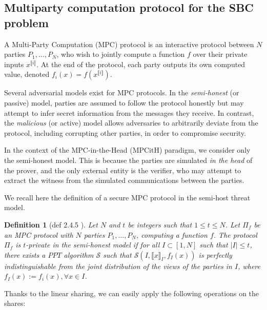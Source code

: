 \documentclass[english]{article}
\newtheorem{definition}{Definition}[section]
\newcommand{\lir}{\llbracket i \rrbracket}
\begin{document}
		\subsection{Multiparty computation protocol for the SBC problem}
		A Multi-Party Computation (MPC) protocol is an interactive protocol between $N$ parties $P_1, \dots, P_N$, who wish to jointly compute a function $f$ over their private inputs $x^{\lir}$. At the end of the protocol, each party outputs its own computed value, denoted $f_i(x) = f(x^{\lir})$.
		
		Several adversarial models exist for MPC protocols. In the \emph{semi-honest} (or passive) model, parties are assumed to follow the protocol honestly but may attempt to infer secret information from the messages they receive. In contrast, the \emph{malicious} (or active) model allows adversaries to arbitrarily deviate from the protocol, including corrupting other parties, in order to compromise security.
		
		In the context of the MPC-in-the-Head (MPCitH) paradigm, we consider only the semi-honest model. This is because the parties are simulated \emph{in the head} of the prover, and the only external entity is the verifier, who may attempt to extract the witness from the simulated communications between the parties.
		
		We recall here the definition of a secure MPC protocol in the semi-host threat model.
		
		\begin{definition}[def 2.4.5 \cite{feneu2023}]
			Let $N$ and $t$ be integers such that $1 \leq t \leq N$. Let $\Pi_f$ be an MPC protocol with $N$ parties $P_1,\dots,P_N$, computing a function $f$. The protocol $\Pi_f$ is $t$-private in the semi-honest model if for all $I \subset [1, N]$ such that $|I| \leq t$, there exists a $PPT$ algorithm $\mathcal{S}$ such that $\mathcal{S}(I, \llbracket x \rrbracket_I, f_I(x))$ is perfectly indistinguishable from the joint distribution of the views of the parties in $I$, where $f_I(x) := {f_i(x), \forall x \in I}$.	
		\end{definition}
		
		Thanks to the linear sharing, we can easily apply the following operations on the shares:
		
\end{document}
